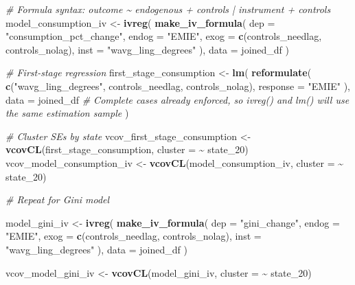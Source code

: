 \documentclass[
]{article}
\newenvironment{Shaded}{\begin{snugshade}}{\end{snugshade}}
\newcommand{\AttributeTok}[1]{\textcolor[rgb]{0.13,0.29,0.53}{#1}}
\newcommand{\CommentTok}[1]{\textcolor[rgb]{0.56,0.35,0.01}{\textit{#1}}}
\newcommand{\FunctionTok}[1]{\textcolor[rgb]{0.13,0.29,0.53}{\textbf{#1}}}
\newcommand{\NormalTok}[1]{#1}
\newcommand{\OtherTok}[1]{\textcolor[rgb]{0.56,0.35,0.01}{#1}}
\newcommand{\SpecialCharTok}[1]{\textcolor[rgb]{0.81,0.36,0.00}{\textbf{#1}}}
\newcommand{\StringTok}[1]{\textcolor[rgb]{0.31,0.60,0.02}{#1}}
\begin{document}
\begin{Shaded}
\begin{Highlighting}[]
\CommentTok{\# Formula syntax: outcome \textasciitilde{} endogenous + controls | instrument + controls}
\NormalTok{model\_consumption\_iv }\OtherTok{\textless{}{-}} \FunctionTok{ivreg}\NormalTok{(}
  \FunctionTok{make\_iv\_formula}\NormalTok{(}
    \AttributeTok{dep =} \StringTok{"consumption\_pct\_change"}\NormalTok{,}
    \AttributeTok{endog =} \StringTok{"EMIE"}\NormalTok{,}
    \AttributeTok{exog =} \FunctionTok{c}\NormalTok{(controls\_needlag, controls\_nolag),}
    \AttributeTok{inst =} \StringTok{"wavg\_ling\_degrees"}
\NormalTok{  ),}
  \AttributeTok{data =}\NormalTok{ joined\_df}
\NormalTok{)}

\CommentTok{\# First{-}stage regression}
\NormalTok{first\_stage\_consumption }\OtherTok{\textless{}{-}} \FunctionTok{lm}\NormalTok{(}
  \FunctionTok{reformulate}\NormalTok{(}
    \FunctionTok{c}\NormalTok{(}\StringTok{"wavg\_ling\_degrees"}\NormalTok{, controls\_needlag, controls\_nolag), }
    \AttributeTok{response =} \StringTok{"EMIE"}
\NormalTok{    ),}
  \AttributeTok{data =}\NormalTok{ joined\_df }\CommentTok{\# Complete cases already enforced, so ivreg() and lm() will use the same estimation sample}
\NormalTok{)}


\CommentTok{\# Cluster SEs by state}
\NormalTok{vcov\_first\_stage\_consumption }\OtherTok{\textless{}{-}} \FunctionTok{vcovCL}\NormalTok{(first\_stage\_consumption, }\AttributeTok{cluster =} \SpecialCharTok{\textasciitilde{}}\NormalTok{ state\_20)}
\NormalTok{vcov\_model\_consumption\_iv }\OtherTok{\textless{}{-}} \FunctionTok{vcovCL}\NormalTok{(model\_consumption\_iv, }\AttributeTok{cluster =} \SpecialCharTok{\textasciitilde{}}\NormalTok{ state\_20)}



\CommentTok{\# Repeat for Gini model}

\NormalTok{model\_gini\_iv }\OtherTok{\textless{}{-}} \FunctionTok{ivreg}\NormalTok{(}
  \FunctionTok{make\_iv\_formula}\NormalTok{(}
    \AttributeTok{dep =} \StringTok{"gini\_change"}\NormalTok{,}
    \AttributeTok{endog =} \StringTok{"EMIE"}\NormalTok{,}
    \AttributeTok{exog =} \FunctionTok{c}\NormalTok{(controls\_needlag, controls\_nolag),}
    \AttributeTok{inst =} \StringTok{"wavg\_ling\_degrees"}
\NormalTok{  ),}
  \AttributeTok{data =}\NormalTok{ joined\_df}
\NormalTok{)}

\NormalTok{vcov\_model\_gini\_iv }\OtherTok{\textless{}{-}} \FunctionTok{vcovCL}\NormalTok{(model\_gini\_iv, }\AttributeTok{cluster =} \SpecialCharTok{\textasciitilde{}}\NormalTok{ state\_20)}
\end{Highlighting}
\end{Shaded}
\end{document}
